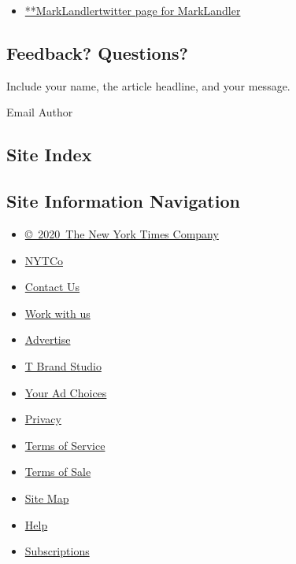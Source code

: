 \begin{itemize}
\tightlist
\item
  \href{https://twitter.com/MarkLandler}{**MarkLandlertwitter page for
  MarkLandler}
\end{itemize}

\hypertarget{feedback-questions}{%
\subsection{Feedback? Questions?}\label{feedback-questions}}

Include your name, the article headline, and your message.

Email Author

\hypertarget{site-index}{%
\subsection{Site Index}\label{site-index}}

\hypertarget{site-information-navigation}{%
\subsection{Site Information
Navigation}\label{site-information-navigation}}

\begin{itemize}
\tightlist
\item
  \href{https://help.nytimes3xbfgragh.onion/hc/en-us/articles/115014792127-Copyright-notice}{©~2020~The
  New York Times Company}
\end{itemize}

\begin{itemize}
\tightlist
\item
  \href{https://www.nytco.com/}{NYTCo}
\item
  \href{https://help.nytimes3xbfgragh.onion/hc/en-us/articles/115015385887-Contact-Us}{Contact
  Us}
\item
  \href{https://www.nytco.com/careers/}{Work with us}
\item
  \href{https://nytmediakit.com/}{Advertise}
\item
  \href{http://www.tbrandstudio.com/}{T Brand Studio}
\item
  \href{https://www.nytimes3xbfgragh.onion/privacy/cookie-policy\#how-do-i-manage-trackers}{Your
  Ad Choices}
\item
  \href{https://www.nytimes3xbfgragh.onion/privacy}{Privacy}
\item
  \href{https://help.nytimes3xbfgragh.onion/hc/en-us/articles/115014893428-Terms-of-service}{Terms
  of Service}
\item
  \href{https://help.nytimes3xbfgragh.onion/hc/en-us/articles/115014893968-Terms-of-sale}{Terms
  of Sale}
\item
  \href{https://spiderbites.nytimes3xbfgragh.onion}{Site Map}
\item
  \href{https://help.nytimes3xbfgragh.onion/hc/en-us}{Help}
\item
  \href{https://www.nytimes3xbfgragh.onion/subscription?campaignId=37WXW}{Subscriptions}
\end{itemize}

